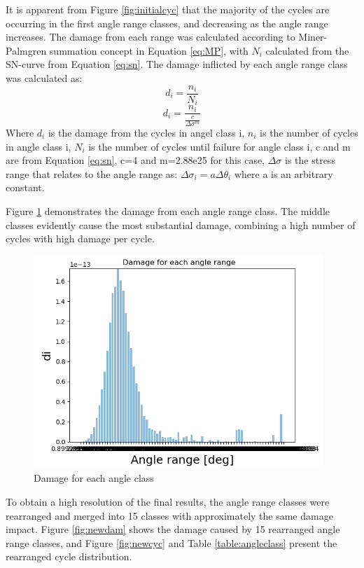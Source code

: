 \noindent It is apparent from Figure \ref{fig:initialcyc} that the majority of the cycles are occurring in the first angle range classes, and decreasing as the angle range increases.\newline
\newline
The damage from each range was calculated according to Miner-Palmgren summation concept in Equation \ref{eq:MP}, with $N_i$ calculated from the SN-curve from Equation \ref{eq:sn}. The damage inflicted by each angle range class was calculated as:
\begin{equation}
    d_i  = \frac{n_i}{N_i}
\end{equation}
\begin{equation}
    d_i=\frac{n_i}{\frac{c}{\Delta \sigma ^m}}
\end{equation}
Where $d_i$ is the damage from the cycles in angel class i, $n_i$ is the number of cycles in angle class i, $N_i$ is the number of cycles until failure for angle class i, c and m are from Equation \ref{eq:sn}, c=4 and m=2.88e25 for this case,  $\Delta \sigma$ is the stress range that relates to the angle range as: $\Delta \sigma_i = a \Delta \theta_i$ where a is an arbitrary constant.\newline
\newline 

Figure \ref{fig:initialdam} demonstrates the damage from each angle range class. The middle classes evidently cause the most substantial damage, combining a high number of cycles with high damage per cycle. 
\begin{figure}[H]
\centering
\includegraphics[scale=0.9]{figures/initialdam}
\caption[$\; \:$Damage for each angle class]{Damage for each angle class}
 \label{fig:initialdam}
\end{figure}
To obtain a high resolution of the final results, the angle range classes were rearranged and merged into 15 classes with approximately the same damage impact. Figure \ref{fig:newdam} shows the damage caused by 15 rearranged angle range classes, and Figure \ref{fig:newcyc} and Table \ref{table:angleclass} present the rearranged cycle distribution.  


